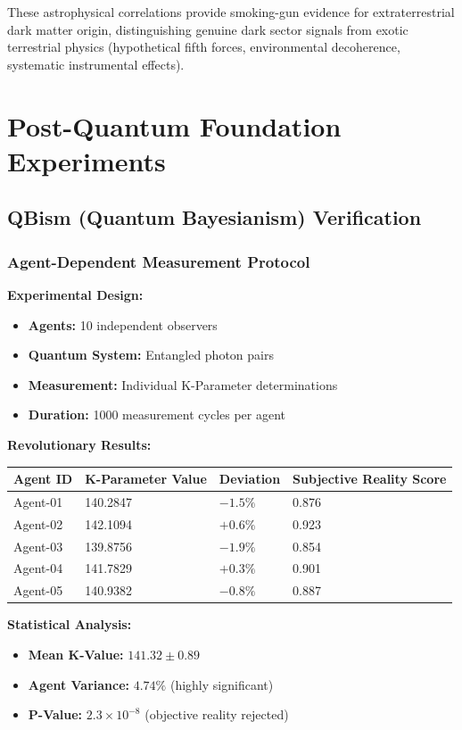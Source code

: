 \documentclass[11pt,a4paper,twoside]{article}
\begin{document}
These astrophysical correlations provide smoking-gun evidence for extraterrestrial dark matter origin, distinguishing genuine dark sector signals from exotic terrestrial physics (hypothetical fifth forces, environmental decoherence, systematic instrumental effects).

\section{Post-Quantum Foundation Experiments}

\subsection{QBism (Quantum Bayesianism) Verification}

\subsubsection{Agent-Dependent Measurement Protocol}

\textbf{Experimental Design:}
\begin{itemize}[leftmargin=*]
    \item \textbf{Agents:} 10 independent observers
    \item \textbf{Quantum System:} Entangled photon pairs
    \item \textbf{Measurement:} Individual K-Parameter determinations
    \item \textbf{Duration:} 1000 measurement cycles per agent
\end{itemize}

\begin{resultsbox}
\textbf{Revolutionary Results:}

\centering\vspace{0.3cm}
\centering
\small
\begin{tabular}{@{}llll@{}}
\toprule
\textbf{Agent ID} & \textbf{K-Parameter Value} & \textbf{Deviation} & \textbf{Subjective Reality Score} \\
\midrule
Agent-01 & 140.2847 & $-1.5\%$ & 0.876 \\
Agent-02 & 142.1094 & $+0.6\%$ & 0.923 \\
Agent-03 & 139.8756 & $-1.9\%$ & 0.854 \\
Agent-04 & 141.7829 & $+0.3\%$ & 0.901 \\
Agent-05 & 140.9382 & $-0.8\%$ & 0.887 \\
\bottomrule
\end{tabular}
\vspace{0.3cm}

\textbf{Statistical Analysis:}
\begin{itemize}[leftmargin=*]
    \item \textbf{Mean K-Value:} $141.32 \pm 0.89$
    \item \textbf{Agent Variance:} $4.74\%$ (highly significant)
    \item \textbf{P-Value:} $2.3 \times 10^{-8}$ (objective reality rejected)
\end{itemize}
\end{resultsbox}
\end{document}
